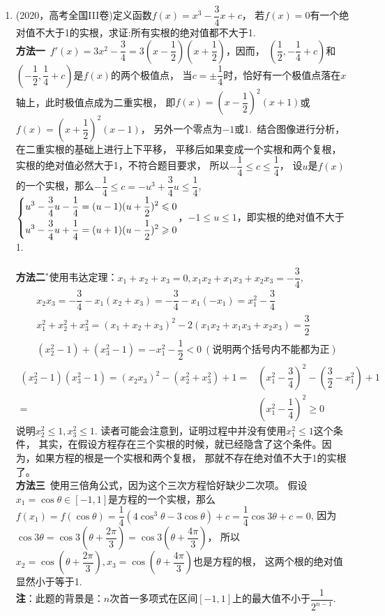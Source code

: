 \begin{enumerate}[label={【\textbf{例\thechapter.\arabic*}】},
 leftmargin=\inteval{\myenumleftmargin}pt,
 itemsep=\inteval{\myenumitempsep}pt,
 itemindent=\inteval{\myenumitemindent}pt]
\item (2020，高考全国III卷)定义函数$ f(x)=x^3-\dfrac{3}{4}x+c $，
若$ f(x)=0 $有一个绝对值不大于1的实根，求证:所有实根的绝对值都不大于1.\\
\textbf{方法一}\ $ f'(x)=3x^2-\dfrac{3}{4}=3(x-\dfrac{1}{2})(x+\dfrac{1}{2}) $，因而，
$ (\dfrac{1}{2},-\dfrac{1}{4}+c) $和$ (-\dfrac{1}{2},\dfrac{1}{4}+c) $是$ f(x) $的两个极值点，
当$ c=\pm \dfrac{1}{4} $时，恰好有一个极值点落在$ x $轴上，此时极值点成为二重实根，
即$ f(x)=\left(x-\dfrac{1}{2} \right)^2(x+1)  $或$ f(x)=\left(x+\dfrac{1}{2} \right)^2(x-1)  $，
另外一个零点为$ -1 $或1.\ 结合图像进行分析，在二重实根的基础上进行上下平移，
平移后如果变成一个实根和两个复根，实根的绝对值必然大于1，不符合题目要求，
所以$ -\dfrac{1}{4}\leq c \leq \dfrac{1}{4} $，%
设$ u $是$ f(x) $的一个实根，那么$ -\dfrac{1}{4}\leq c=-u^3+\dfrac{3}{4}u \leq \dfrac{1}{4} $, 
$ \begin{dcases}
    u^3-\dfrac{3}{4}u-\dfrac{1}{4}=(u-1)(u+\dfrac{1}{2})^2 \leq 0 \\
    u^3-\dfrac{3}{4}u+\dfrac{1}{4}=(u+1)(u-\dfrac{1}{2})^2 \geq 0 
\end{dcases} $，$ -1 \leq u \leq 1 $，即实根的绝对值不大于1.\\
\\
\textbf{方法二}$ ^* $使用韦达定理：$ x_1+x_2+x_3=0,x_1x_2+x_1x_3+x_2x_3=-\dfrac{3}{4} $,
\begin{align*}
    &  x_2x_3=-\dfrac{3}{4}-x_1(x_2+x_3)=-\dfrac{3}{4}-x_1(-x_1)=x_1^2-\dfrac{3}{4}  \\
    & x_1^2+x_2^2+x_3^2=(x_1+x_2+x_3)^2-2(x_1x_2+x_1x_3+x_2x_3) =\dfrac{3}{2}  \\
    & (x_2^2-1)+(x_3^2-1)=-x_1^2-\dfrac{1}{2} < 0\ (\text{说明两个括号内不能都为正})
\end{align*}
\vspace{-0.7cm}
\begin{align*}
    (x_2^2-1)(x_3^2-1)=(x_2x_3)^2-(x_2^2+x_3^2)+1 = &
    \left( x_1^2-\dfrac{3}{4} \right)^2-\left( \dfrac{3}{2}-x_1^2\right)  +1\\
    = & \left( x_1^2-\dfrac{1}{4}\right) ^2 \geq 0
\end{align*}
说明$ x_2^2\leq 1,x_3^2\leq 1 $. 读者可能会注意到，证明过程中并没有使用$ x_1^2\leq 1 $这个条件，
其实，在假设方程存在三个实根的时候，就已经隐含了这个条件。因为，如果方程的根是一个实根和两个复根，
那就不存在绝对值不大于1的实根了。\\
\textbf{方法三}\ 使用三倍角公式，因为这个三次方程恰好缺少二次项。
假设$ x_1=\cos \theta \in [-1,1] $是方程的一个实根，那么$ f(x_1)
=f(\cos \theta)=\dfrac{1}{4}(4\cos^3 \theta-3\cos \theta)+c=\dfrac{1}{4}\cos3\theta + c=0 $,
因为$ \cos3\theta=\cos3(\theta+\dfrac{2\pi}{3})=\cos3(\theta+\dfrac{4\pi}{3}) $，
所以$ x_2=\cos(\theta+\dfrac{2\pi}{3}),x_3=\cos(\theta+\dfrac{4\pi}{3}) $也是方程的根，
这两个根的绝对值显然小于等于1.  \\
\textbf{注}：此题的背景是：$ n $次首一多项式在区间$ [-1,1] $上的最大值不小于$ \dfrac{1}{2^{n-1}} $.


\end{enumerate}
